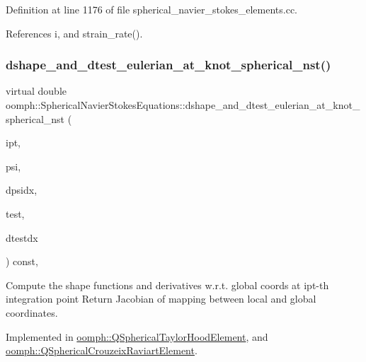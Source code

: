 Definition at line 1176 of file spherical\+\_\+navier\+\_\+stokes\+\_\+elements.\+cc.



References i, and strain\+\_\+rate().

\mbox{\label{classoomph_1_1SphericalNavierStokesEquations_a10ed6f34245f5b31095ae636fc08749a}} 
\subsubsection{\texorpdfstring{dshape\+\_\+and\+\_\+dtest\+\_\+eulerian\+\_\+at\+\_\+knot\+\_\+spherical\+\_\+nst()}{dshape\_and\_dtest\_eulerian\_at\_knot\_spherical\_nst()}}
{\footnotesize\ttfamily virtual double oomph\+::\+Spherical\+Navier\+Stokes\+Equations\+::dshape\+\_\+and\+\_\+dtest\+\_\+eulerian\+\_\+at\+\_\+knot\+\_\+spherical\+\_\+nst (\begin{DoxyParamCaption}\item[{const unsigned \&}]{ipt,  }\item[{\hyperlink{classoomph_1_1Shape}{Shape} \&}]{psi,  }\item[{\hyperlink{classoomph_1_1DShape}{D\+Shape} \&}]{dpsidx,  }\item[{\hyperlink{classoomph_1_1Shape}{Shape} \&}]{test,  }\item[{\hyperlink{classoomph_1_1DShape}{D\+Shape} \&}]{dtestdx }\end{DoxyParamCaption}) const\hspace{0.3cm}{\ttfamily [protected]}, {}}



Compute the shape functions and derivatives w.\+r.\+t. global coords at ipt-\/th integration point Return Jacobian of mapping between local and global coordinates. 



Implemented in \hyperlink{classoomph_1_1QSphericalTaylorHoodElement_accf74eeba4a63dff1ca12048b751fed2}{oomph\+::\+Q\+Spherical\+Taylor\+Hood\+Element}, and \hyperlink{classoomph_1_1QSphericalCrouzeixRaviartElement_a75cdf25c724edcd05b37f5bc2c29e903}{oomph\+::\+Q\+Spherical\+Crouzeix\+Raviart\+Element}.



